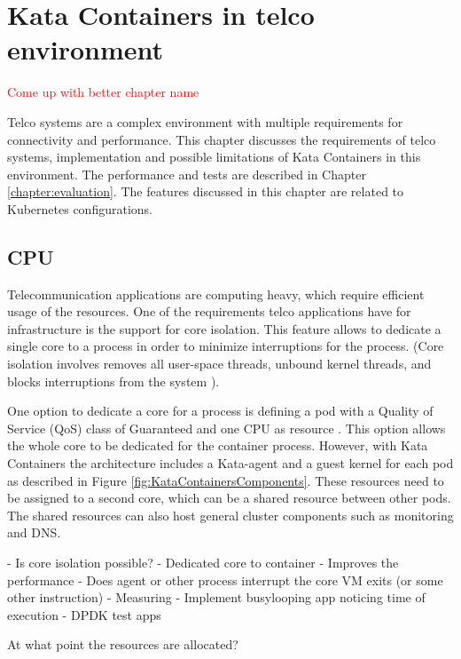 \chapter{Kata Containers in telco environment}
\label{chapter:implementation}

\textcolor{red}{Come up with better chapter name}

Telco systems are a complex environment with multiple requirements for connectivity and performance. This chapter discusses the requirements of telco systems, implementation and possible limitations of Kata Containers in this environment. The performance and tests are described in Chapter \ref{chapter:evaluation}. The features discussed in this chapter are related to Kubernetes configurations.

\section{CPU}

Telecommunication applications are computing heavy, which require efficient usage of the resources. One of the requirements telco applications have for infrastructure is the support for core isolation. This feature allows to dedicate a single core to a process in order to minimize interruptions for the process. (Core isolation involves removes all user-space threads, unbound kernel threads, and blocks interruptions from the system \cite{CPUisolation}).

One option to dedicate a core for a process is defining a pod with a Quality of Service (QoS) class of Guaranteed and one CPU as resource \cite{QOSKubernetes}. This option allows the whole core to be dedicated for the container process. However, with Kata Containers the architecture includes a Kata-agent and a guest kernel for each pod as described in Figure \ref{fig:KataContainersComponents}. These resources need to be assigned to a second core, which can be a shared resource between other pods. The shared resources can also host general cluster components such as monitoring and DNS.



- Is core isolation possible?
	- Dedicated core to container
		- Improves the performance
	- Does agent or other process interrupt the core VM exits (or some other instruction)
	- Measuring
		- Implement busylooping app noticing time of execution
		- DPDK test apps

At what point the resources are allocated?




